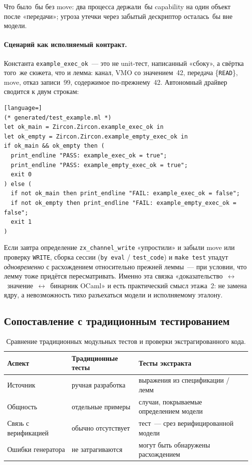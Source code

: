 \documentclass[11pt,a4paper]{article}
\begin{document}
Что было~бы без move: два процесса держали~бы capability на один
объект после «передачи»; угроза утечки через забытый дескриптор
осталась~бы вне модели.

\paragraph{Сценарий как исполняемый контракт.}
Константа \texttt{example\_exec\_ok}~--- это не unit-тест, написанный
«сбоку», а свёртка того~же сюжета, что и лемма: канал, VMO со
значением~42, передача \{\texttt{READ}\}, move, отказ записи~99,
содержимое по-прежнему~42. Автономный драйвер сводится к двум
строкам:
\begin{lstlisting}[language=]
(* generated/test_example.ml *)
let ok_main = Zircon.Zircon.example_exec_ok in
let ok_empty = Zircon.Zircon.example_empty_exec_ok in
if ok_main && ok_empty then (
  print_endline "PASS: example_exec_ok = true";
  print_endline "PASS: example_empty_exec_ok = true";
  exit 0
) else (
  if not ok_main then print_endline "FAIL: example_exec_ok = false";
  if not ok_empty then print_endline "FAIL: example_empty_exec_ok = false";
  exit 1
)
\end{lstlisting}
Если завтра определение \texttt{zx\_channel\_write} «упростили» и
забыли move или проверку \texttt{WRITE}, сборка сессии
(\texttt{by~eval} / \texttt{test\_code}) и \texttt{make test}
упадут \emph{одновременно} с расхождением относительно прежней
леммы~--- при условии, что лемму тоже придётся пересматривать.
Именно эта связка «доказательство~$\leftrightarrow$~значение~$\leftrightarrow$~бинарник
OCaml» и есть практический смысл этажа~2: не замена ядру, а
невозможность тихо разъехаться модели и исполняемому эталону.

\subsection{Сопоставление с традиционным тестированием}

\begin{table}[ht]
	\centering
	\caption{Сравнение традиционных модульных тестов и проверки
		экстрагированного кода.}
	\label{tab:codegen}
	\begin{tabular}{@{}p{}p{}p{}@{}}
		\toprule
		\textbf{Аспект}             &
		\textbf{Традиционные тесты} &
		\textbf{Тесты экстракта}                \\
		\midrule
		Источник                    &
		ручная разработка           &
		выражения из спецификации / лемм        \\
		Общность                    &
		отдельные примеры           &
		случаи, покрываемые определением модели \\
		Связь с верификацией        &
		обычно отсутствует          &
		тест~--- срез верифицированной модели   \\
		Ошибки генератора           &
		не затрагиваются            &
		могут быть обнаружены расхождением      \\
		\bottomrule
	\end{tabular}
\end{table}
\end{document}
